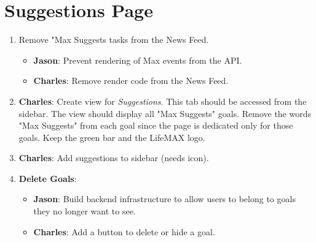 \documentclass[12pt]{article}
\begin{document}
\section{Suggestions Page}
\begin{enumerate}
\item Remove "Max Suggests tasks from the News Feed.
	\begin{itemize}
	\item \textbf{Jason}: Prevent rendering of Max events from the API.
	\item \textbf{Charles}: Remove render code from the News Feed.
	\end{itemize}
\item \textbf{Charles}: Create view for \emph{Suggestions}.  This tab should be accessed from the sidebar.  The view should display all "Max Suggests" goals.  Remove the words "Max Suggests" from each goal since the page is dedicated only for those goals.  Keep the green bar and the LifeMAX logo.
\item \textbf{Charles}: Add suggestions to sidebar (needs icon).
\item \textbf{Delete Goals}:
	\begin{itemize}
	\item \textbf{Jason}: Build backend infrastructure to allow users to belong to goals they no longer want to see.
	\item \textbf{Charles}: Add a button to delete or hide a goal.
	\end{itemize}
\end{enumerate}
\end{document}
